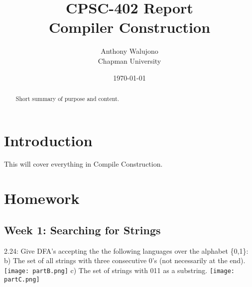 \documentclass{article}
\title{CPSC-402 Report\\Compiler Construction}
\author{Anthony Walujono \\ Chapman University}
\date{\today}
\theoremstyle{theorem}
\theoremstyle{definition}
\theoremstyle{remark}
\begin{document}
\maketitle

\begin{abstract}
Short  summary of purpose and content.  
\end{abstract}

\tableofcontents

\section{Introduction}\label{intro}

This will cover everything in Compile Construction.

\section{Homework}\label{homework}
\subsection{Week 1: Searching for Strings}
2.24: Give DFA's accepting the the following languages over the alphabet \{0,1\}:
\newline \indent b) The set of all strings with three consecutive 0's (not necessarily at the end).
\newline \indent \texttt{[image: partB.png]}
\newline \indent c) The set of strings with 011 as a substring.
\newline \indent \texttt{[image: partC.png]}
\end{document}
